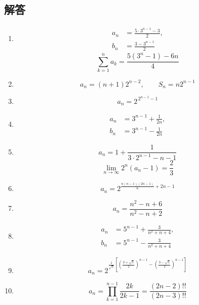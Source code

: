     \subsection{解答}\label{節：高難易度のもの：解答}
      \begin{enumerate}[label=\textbf{問\arabic*.},leftmargin=3.8em,format=\bookitemlink{practice-advanced}{answer}{problem}]
        \item \[
            \begin{aligned}
              a_n &= \frac{5\cdot3^{n-1}-3}{2},\\
              b_n &= \frac{3-3^{n-1}}2
            \end{aligned}
          \]
          \[
            \sum_{k=1}^{n}a_k=
            \frac{5(3^n-1)-6n}{4}
          \]
        \item \[
            a_n=(n+1)2^{n-2},\qquad
            S_n=n2^{n-1}
          \]
        \item \[
            a_n=2^{\,2^{n-1}-1}
          \]
        \item \[
            \begin{aligned}
              a_n &= 3^{n-1}+\frac1{2n},\\
              b_n &= 3^{n-1}-\frac1{2n}
            \end{aligned}
          \]
        \item \[
            a_n=1+\frac1{3\cdot2^{n-1}-n-1}
          \]
          \[
            \lim_{n\to\infty}2^n(a_n-1)=\frac23
          \]
        \item \[
            a_n=
            2^{\frac{n(n-1)(2n-1)}6+2n-1}
          \]
        \item \[
            a_n=\frac{n^2-n+6}{n^2-n+2}
          \]
        \item \[
            \begin{aligned}
              a_n &= 5^{n-1}+\frac3{n^2+n+4},\\
              b_n &= 5^{n-1}-\frac3{n^2+n+4}
            \end{aligned}
          \]
        \item \[
            a_n=
            2^{
            \frac1{\sqrt5}
            \left[
            \left(\frac{3+\sqrt5}{2}\right)^{n-1}
            -
            \left(\frac{3-\sqrt5}{2}\right)^{n-1}
            \right]
            }
          \]
        \item \[
            a_n=
            \prod_{k=1}^{n-1}\frac{2k}{2k-1}
            =
            \frac{(2n-2)!!}{(2n-3)!!}
          \]

\end{enumerate}
